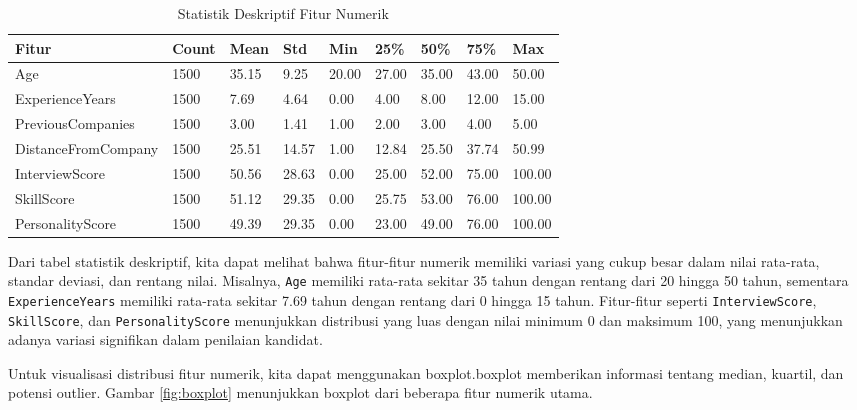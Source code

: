 \begin{table}[H]
    \centering
    \caption{Statistik Deskriptif Fitur Numerik}
    \label{tb:statistik-deskriptif}
    \begin{tabular}{|l|l|l|l|l|l|l|l|l|}
    \hline
    \rowcolor[HTML]{EFEFEF} 
    Fitur               & Count & Mean  & Std   & Min   & 25\%  & 50\%  & 75\%  & Max   \\ \hline
    Age                 & 1500  & 35.15 & 9.25  & 20.00 & 27.00 & 35.00 & 43.00 & 50.00 \\ \hline
    ExperienceYears     & 1500  & 7.69  & 4.64  & 0.00  & 4.00  & 8.00  & 12.00 & 15.00 \\ \hline
    PreviousCompanies   & 1500  & 3.00  & 1.41  & 1.00  & 2.00  & 3.00  & 4.00  & 5.00  \\ \hline
    DistanceFromCompany & 1500  & 25.51 & 14.57 & 1.00  & 12.84 & 25.50 & 37.74 & 50.99 \\ \hline
    InterviewScore      & 1500  & 50.56 & 28.63 & 0.00  & 25.00 & 52.00 & 75.00 & 100.00\\ \hline
    SkillScore          & 1500  & 51.12 & 29.35 & 0.00  & 25.75 & 53.00 & 76.00 & 100.00\\ \hline
    PersonalityScore    & 1500  & 49.39 & 29.35 & 0.00   &23.00&49.00&76.00&100.00\\ \hline
    \end{tabular}
\end{table}

Dari tabel statistik deskriptif, kita dapat melihat bahwa fitur-fitur numerik memiliki variasi yang cukup besar dalam nilai rata-rata, standar deviasi, dan rentang nilai. Misalnya, \texttt{Age} memiliki rata-rata sekitar 35 tahun dengan rentang dari 20 hingga 50 tahun, sementara \texttt{ExperienceYears} memiliki rata-rata sekitar 7.69 tahun dengan rentang dari 0 hingga 15 tahun. Fitur-fitur seperti \texttt{InterviewScore}, \texttt{SkillScore}, dan \texttt{PersonalityScore} menunjukkan distribusi yang luas dengan nilai minimum 0 dan maksimum 100, yang menunjukkan adanya variasi signifikan dalam penilaian kandidat.

Untuk visualisasi distribusi fitur numerik, kita dapat menggunakan boxplot.boxplot memberikan informasi tentang median, kuartil, dan potensi outlier. Gambar \ref{fig:boxplot} menunjukkan boxplot dari beberapa fitur numerik utama.

